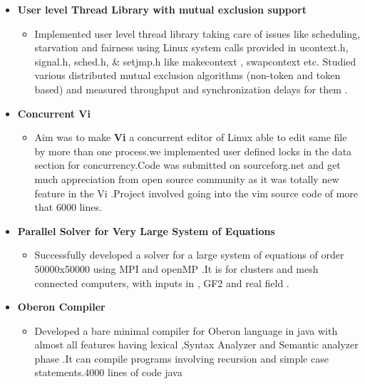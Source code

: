 \documentclass[margin]{res}
\makeatletter
\newcommand{\resitem}[1]{\item #1 \vspace{-2pt}}
\newcommand{\ressubheading}[4]{
\begin{tabular*}{6.5in}{l@{\extracolsep{\fill}}r}
		\textbf{#1} & #2 \\
		\textit{#3} & \textit{#4} \\
\end{tabular*}\vspace{-6pt}}
\makeatother
\begin{document}
\begin{itemize}
\vspace{-0.1in}
			\item \textbf{User level Thread Library with mutual exclusion support }	
		\vspace{-0.1in}	
		\begin{itemize}
		\resitem{
		Implemented user level thread library taking care of issues like scheduling, starvation and fairness using  Linux system calls provided in ucontext.h, signal.h, sched.h, \& setjmp.h like makecontext , swapcontext etc.
Studied various distributed mutual exclusion algorithms (non-token and token based) and measured throughput
and synchronization delays for  them .
		 }
		\end{itemize}	
		\vspace{-0.1in}
			\item \textbf{Concurrent Vi }	
		\vspace{-0.1in}	
		\begin{itemize}
		\resitem{Aim was to make \textbf{Vi} a concurrent editor of Linux able to edit same file by more than one process.we implemented user defined locks in the data section for concurrency.Code was submitted on sourceforg.net and get much appreciation from open source community as it was totally new feature in the Vi  .Project involved going into the vim source code of more that 6000 lines. }
		\end{itemize}	
\vspace{-0.1in}		
			\item \textbf{Parallel Solver for Very Large System of Equations }
		\vspace{-0.1in}
		\begin{itemize}
		\resitem{ Successfully developed a solver for a large system of equations of order 50000x50000 using MPI and openMP .It is for clusters and mesh connected computers, with inputs in , GF2  and  real field . }
		
		\end{itemize}			
	\vspace{-0.1in}
	\item \textbf{Oberon Compiler }
		\vspace{-0.1in}
		\begin{itemize}
		\resitem{ Developed a bare minimal compiler for Oberon language in java with almost all  features having  lexical ,Syntax Analyzer and  Semantic analyzer phase .It can compile programs involving recursion and simple case statements.4000 lines of code java}
		\end{itemize}		
		

\end{itemize}
\end{document}
